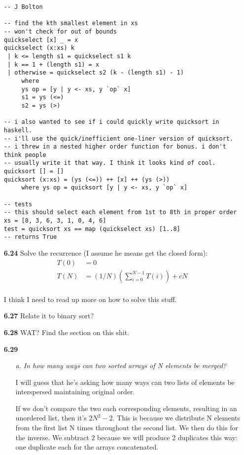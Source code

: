 \documentclass{article}
\begin{document}
\begin{enumerate}
\begin{verbatim}
-- J Bolton

-- find the kth smallest element in xs
-- won't check for out of bounds
quickselect [x] _ = x
quickselect (x:xs) k
 | k <= length s1 = quickselect s1 k
 | k == 1 + (length s1) = x
 | otherwise = quickselect s2 (k - (length s1) - 1)
	 where
	 ys op = [y | y <- xs, y `op` x]
	 s1 = ys (<=)
	 s2 = ys (>)

-- i also wanted to see if i could quickly write quicksort in haskell.
-- i'll use the quick/inefficient one-liner version of quicksort.
-- i threw in a nested higher order function for bonus. i don't think people
-- usually write it that way. I think it looks kind of cool.
quicksort [] = []
quicksort (x:xs) = (ys (<=)) ++ [x] ++ (ys (>))
	 where ys op = quicksort [y | y <- xs, y `op` x]

-- tests
-- this should select each element from 1st to 8th in proper order
xs = [8, 3, 6, 3, 1, 0, 4, 6]
test = quicksort xs == map (quickselect xs) [1..8]
-- returns True
\end{verbatim}

\item[\textbf{6.24}]
Solve the recurrence (I assume he means get the closed form):
\begin{align*}
T(0) &= 0 \\
T(N) &= (1/N)\left( \sum^{N-1}_{i=0}T(i) \right) + cN \\
\end{align*}

I think I need to read up more on how to solve this stuff.

\item[\textbf{6.27}]
Relate it to binary sort?

\item[\textbf{6.28}]
WAT? Find the section on this shit.

\item[\textbf{6.29}]
\begin{enumerate}
	\item[\textit{a.}]
	\textit{In how many ways can two sorted arrays of N elements be merged?}

	I will guess that he's asking how many ways can two lists of elements be
	interspersed maintaining original order.

	If we don't compare the two each corresponding elements, resulting in an
	unordered list, then it's $2N^2 - 2$.  This is because we distribute N elements
	from the first list N times throughout the second list.  We then do this for
	the inverse. We subtract 2 because we will produce 2 duplicates this
	way: one duplicate each for the arrays concatenated.


\end{enumerate}
\end{enumerate}
\end{document}

